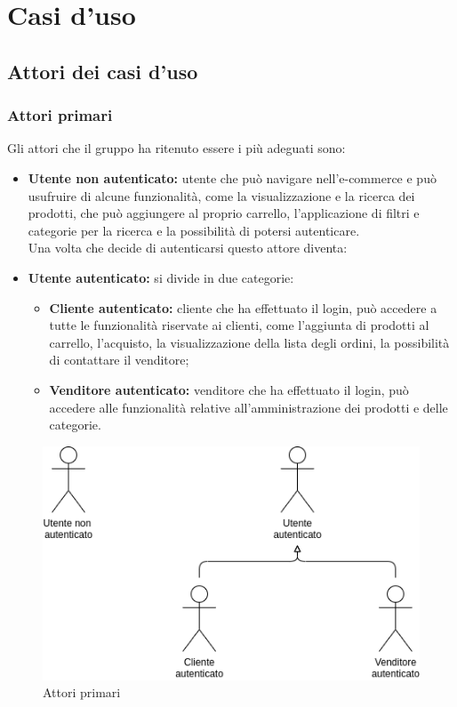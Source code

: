 \section{Casi d'uso}
\subsection{Attori dei casi d'uso}
\subsubsection{Attori primari}
Gli attori che il gruppo ha ritenuto essere i più adeguati sono:
\begin{itemize}
    \item \textbf{Utente non autenticato:} utente che può navigare nell'e-commerce e può usufruire di alcune funzionalità, come la visualizzazione e la ricerca dei prodotti, che può aggiungere al proprio carrello, l'applicazione di filtri e categorie per la ricerca e la possibilità di potersi autenticare.\\
    Una volta che decide di autenticarsi questo attore diventa:
    \item \textbf{Utente autenticato:} si divide in due categorie:
        \begin{itemize}
            \item \textbf{Cliente autenticato:} cliente che ha effettuato il login, può accedere a tutte le funzionalità riservate ai clienti, come l'aggiunta di prodotti al carrello, l'acquisto, la visualizzazione della lista degli ordini, la possibilità di contattare il venditore;
            \item \textbf{Venditore autenticato:} venditore che ha effettuato il login, può accedere alle funzionalità relative all'amministrazione dei prodotti e delle categorie.
        \end{itemize}
\end{itemize}
\begin{figure}[!ht]
    \caption{Attori primari}
    \vspace{10px}
    \includegraphics[scale=0.6]{../../../Images/AnalisiRequisiti/attori}
    \centering
\end{figure}
